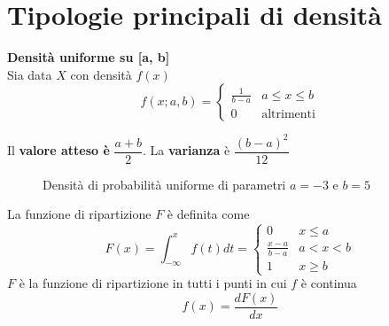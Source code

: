 \section{Tipologie principali di densità}

\begin{defn}
    \textbf{Densità uniforme su [a, b]} \\
    Sia data $ X $ con densità $ f(x) $
    \begin{equation*}
        f(x; a, b) = \begin{cases}
            \frac{1}{b-a} & a \leq x \leq b \\
            0   &    \text{altrimenti}
        \end{cases}
    \end{equation*}

    Il \textbf{valore atteso è} $ \dfrac{a + b}{2} $. La \textbf{varianza} è $
    \dfrac{(b - a)^2}{12}$

    \begin{figure}[htbp]
        \centering

        \caption{Densità di probabilità uniforme di parametri $a = -3$ e $b = 5$}
        \label{uniform}
    \end{figure}


    La funzione di ripartizione $F$ è definita come
    \begin{equation*}
        F(x) = \int_{-\infty}^x f(t) dt = \begin{cases}
            0 & x \leq a \\
            \frac{x-a}{b-a} & a < x < b \\
            1 & x \geq b
        \end{cases}
    \end{equation*}
    $ F $ è la funzione di ripartizione in tutti i punti in cui $ f $ è continua
    \begin{equation*}
        f(x) = \frac{dF(x)}{dx}
    \end{equation*}

    \begin{figure}[htbp]
        \centering


\end{figure}
\end{defn}
